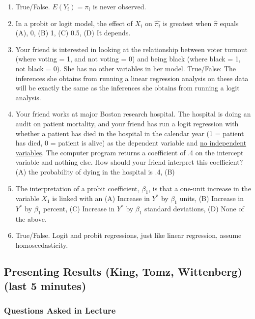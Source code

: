 \documentclass[11pt]{article}
\begin{document}
\begin{enumerate}
\item True/False. $E(Y_i)=\pi_i$ is never observed. %
\item In a probit or logit model, the effect of $X_i$ on $\hat{\pi_i}$ is greatest when $\hat{\pi}$ equals (A), 0, (B) 1, (C) 0.5, (D) It depends. 
\item Your friend is interested in looking at the relationship between voter turnout (where voting = 1, and not voting = 0) and being black (where black = 1, not black = 0). She has no other variables in her model.  True/False: The inferences she obtains from running a linear regression analysis on these data will be exactly the same as the inferences she obtains from running a logit analysis.
\item Your friend works at major Boston research hospital. The hospital is doing an audit on patient mortality, and your friend has run a logit regression with whether a patient has died in the hospital in the calendar year (1 = patient has died, 0 = patient is alive) as the dependent variable and \underline{no independent variables}. The computer program returns a coefficient of .4 on the intercept variable and nothing else.  How should your friend interpret this coefficient? (A) the probability of dying in the hospital is .4, (B) 
\item The interpretation of a probit coefficient, $\beta_1$, is that a one-unit increase in the variable $X_1$ is linked with an (A) Increase in $Y^*$ by $\beta_1$ units, (B) Increase in $Y^*$ by $\beta_1$ percent, (C) Increase in $Y^*$ by $\beta_1$ standard deviations, (D) None of the above. 
\item True/False.  Logit and probit regressions, just like linear regression, assume homoscedasticity. 
\end{enumerate}

\subsection{Presenting Results (King, Tomz, Wittenberg) (last 5 minutes)}

\subsubsection{Questions Asked in Lecture}
\end{document}

